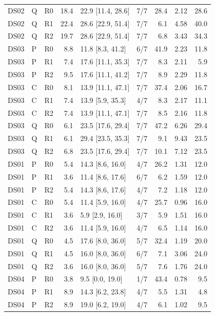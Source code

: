 \documentclass[10pt]{article}
\begin{document}
{\begin{longtable}{lllrlrrrr}
DS02 & Q & R0 & 18.4 & 22.9 [11.4, 28.6] & 7/7 & 28.4 & 2.12 & 28.6 \\
DS02 & Q & R1 & 22.4 & 28.6 [22.9, 51.4] & 7/7 & 6.1 & 4.58 & 40.0 \\
DS02 & Q & R2 & 19.7 & 28.6 [22.9, 51.4] & 7/7 & 6.8 & 3.43 & 34.3 \\
\midrule
DS03 & P & R0 & 8.8 & 11.8 [8.3, 41.2] & 6/7 & 41.9 & 2.23 & 11.8 \\
DS03 & P & R1 & 7.4 & 17.6 [11.1, 35.3] & 7/7 & 8.3 & 2.11 & 5.9 \\
DS03 & P & R2 & 9.5 & 17.6 [11.1, 41.2] & 7/7 & 8.9 & 2.29 & 11.8 \\
DS03 & C & R0 & 8.1 & 13.9 [11.1, 47.1] & 7/7 & 37.4 & 2.06 & 16.7 \\
DS03 & C & R1 & 7.4 & 13.9 [5.9, 35.3] & 4/7 & 8.3 & 2.17 & 11.1 \\
DS03 & C & R2 & 7.4 & 13.9 [11.1, 47.1] & 7/7 & 8.5 & 2.16 & 11.8 \\
DS03 & Q & R0 & 6.1 & 23.5 [17.6, 29.4] & 7/7 & 47.2 & 6.26 & 29.4 \\
DS03 & Q & R1 & 6.1 & 29.4 [23.5, 35.3] & 7/7 & 9.1 & 9.43 & 23.5 \\
DS03 & Q & R2 & 6.8 & 23.5 [17.6, 29.4] & 7/7 & 10.1 & 7.12 & 23.5 \\
\midrule
DS01 & P & R0 & 5.4 & 14.3 [8.6, 16.0] & 4/7 & 26.2 & 1.31 & 12.0 \\
DS01 & P & R1 & 3.6 & 11.4 [8.6, 17.6] & 6/7 & 6.2 & 1.59 & 12.0 \\
DS01 & P & R2 & 5.4 & 14.3 [8.6, 17.6] & 4/7 & 7.2 & 1.18 & 12.0 \\
DS01 & C & R0 & 5.4 & 11.4 [5.9, 16.0] & 4/7 & 25.7 & 0.96 & 16.0 \\
DS01 & C & R1 & 3.6 & 5.9 [2.9, 16.0] & 3/7 & 5.9 & 1.51 & 16.0 \\
DS01 & C & R2 & 3.6 & 11.4 [5.9, 16.0] & 4/7 & 6.5 & 1.14 & 16.0 \\
DS01 & Q & R0 & 4.5 & 17.6 [8.0, 36.0] & 5/7 & 32.4 & 1.19 & 20.0 \\
DS01 & Q & R1 & 4.5 & 16.0 [8.0, 36.0] & 6/7 & 7.1 & 3.06 & 24.0 \\
DS01 & Q & R2 & 3.6 & 16.0 [8.0, 36.0] & 5/7 & 7.6 & 1.76 & 24.0 \\
\midrule
DS04 & P & R0 & 3.8 & 9.5 [0.0, 19.0] & 1/7 & 43.4 & 0.78 & 9.5 \\
DS04 & P & R1 & 8.9 & 14.3 [6.2, 23.8] & 4/7 & 5.5 & 1.31 & 4.8 \\
DS04 & P & R2 & 8.9 & 19.0 [6.2, 19.0] & 4/7 & 6.1 & 1.02 & 9.5 \\

\end{longtable}}
\end{document}
